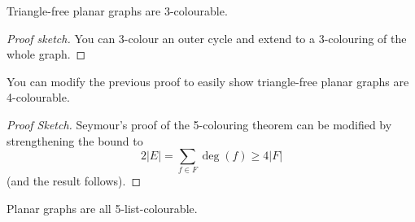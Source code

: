 \documentclass[main.tex]{subfiles}
\begin{document}
\begin{theorem}[Grotzsch 1959]
  Triangle-free planar graphs are 3-colourable.
\end{theorem}
\begin{proof}[Proof sketch]
  You can 3-colour an outer cycle and extend to a 3-colouring of the whole graph.
\end{proof}
You can modify the previous proof to easily show triangle-free planar graphs are
4-colourable.
\begin{proof}[Proof Sketch]
  Seymour's proof of the 5-colouring theorem can be modified by strengthening
  the bound to
  \[
    2|E| = \sum_{f\in F}\deg(f)\geq 4|F|
  \]
  (and the result follows).
\end{proof}

\begin{theorem}[Thoamassen 1995]
  Planar graphs are all 5-list-colourable.
\end{theorem}
\end{document}
